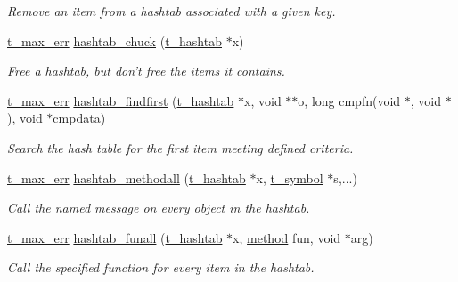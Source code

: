 \begin{DoxyCompactItemize}
\begin{DoxyCompactList}\small\item\em Remove an item from a hashtab associated with a given key. \item\end{DoxyCompactList}\item 
\hyperlink{group__datatypes_ga73edaae82b318855cc09fac994918165}{t\_\-max\_\-err} \hyperlink{group__hashtab_gac3203c76c8321cde39088beab8b4d2e8}{hashtab\_\-chuck} (\hyperlink{structt__hashtab}{t\_\-hashtab} $\ast$x)
\begin{DoxyCompactList}\small\item\em Free a hashtab, but don't free the items it contains. \item\end{DoxyCompactList}\item 
\hyperlink{group__datatypes_ga73edaae82b318855cc09fac994918165}{t\_\-max\_\-err} \hyperlink{group__hashtab_gadc142f0a2a64417bb8b8d3c2959924fd}{hashtab\_\-findfirst} (\hyperlink{structt__hashtab}{t\_\-hashtab} $\ast$x, void $\ast$$\ast$o, long cmpfn(void $\ast$, void $\ast$), void $\ast$cmpdata)
\begin{DoxyCompactList}\small\item\em Search the hash table for the first item meeting defined criteria. \item\end{DoxyCompactList}\item 
\hyperlink{group__datatypes_ga73edaae82b318855cc09fac994918165}{t\_\-max\_\-err} \hyperlink{group__hashtab_ga816a6164c9565fd4269e2b9d8e8a76a3}{hashtab\_\-methodall} (\hyperlink{structt__hashtab}{t\_\-hashtab} $\ast$x, \hyperlink{structt__symbol}{t\_\-symbol} $\ast$s,...)
\begin{DoxyCompactList}\small\item\em Call the named message on every object in the hashtab. \item\end{DoxyCompactList}\item 
\hyperlink{group__datatypes_ga73edaae82b318855cc09fac994918165}{t\_\-max\_\-err} \hyperlink{group__hashtab_ga37e7b5c20c9fc69e9435f788f35335dc}{hashtab\_\-funall} (\hyperlink{structt__hashtab}{t\_\-hashtab} $\ast$x, \hyperlink{group__datatypes_gac26ba0a173b50597f5738132e059b42d}{method} fun, void $\ast$arg)
\begin{DoxyCompactList}\small\item\em Call the specified function for every item in the hashtab. \item\end{DoxyCompactList}\item 
$$
\end{DoxyCompactItemize}
